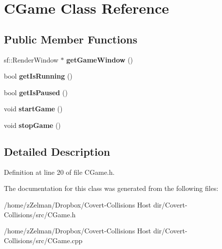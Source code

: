 \hypertarget{classCGame}{\section{C\-Game Class Reference}
\label{classCGame}
}
\subsection*{Public Member Functions}
\begin{DoxyCompactItemize}
\item 
\hypertarget{classCGame_a9ed0bb7ef800bc7e568cf8858c3b96ec}{sf\-::\-Render\-Window $\ast$ {\bfseries get\-Game\-Window} ()}\label{classCGame_a9ed0bb7ef800bc7e568cf8858c3b96ec}

\item 
\hypertarget{classCGame_ae45938d7b77b13d2e80e4f9b3a17a44a}{bool {\bfseries get\-Is\-Running} ()}\label{classCGame_ae45938d7b77b13d2e80e4f9b3a17a44a}

\item 
\hypertarget{classCGame_a9b2f241693b1f024c957f92069fe6ed7}{bool {\bfseries get\-Is\-Paused} ()}\label{classCGame_a9b2f241693b1f024c957f92069fe6ed7}

\item 
\hypertarget{classCGame_aa94f04e2c012603f10430a4d4db3ce27}{void {\bfseries start\-Game} ()}\label{classCGame_aa94f04e2c012603f10430a4d4db3ce27}

\item 
\hypertarget{classCGame_acbad86ee58748e2db0da540f4aa0640e}{void {\bfseries stop\-Game} ()}\label{classCGame_acbad86ee58748e2db0da540f4aa0640e}

\end{DoxyCompactItemize}


\subsection{Detailed Description}


Definition at line 20 of file C\-Game.\-h.



The documentation for this class was generated from the following files\-:\begin{DoxyCompactItemize}
\item 
/home/z\-Zelman/\-Dropbox/\-Covert-\/\-Collisions Host dir/\-Covert-\/\-Collisions/src/C\-Game.\-h\item 
/home/z\-Zelman/\-Dropbox/\-Covert-\/\-Collisions Host dir/\-Covert-\/\-Collisions/src/C\-Game.\-cpp\end{DoxyCompactItemize}
